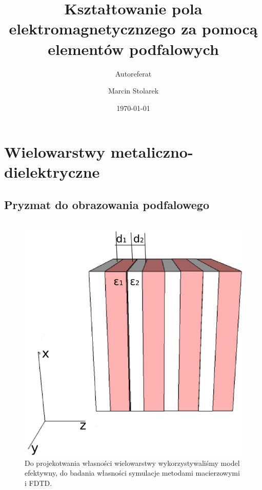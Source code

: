 \documentclass{beamer}
\title{Kształtowanie pola elektromagnetycznzego za pomocą elementów podfalowych}
\subtitle{Autoreferat}
\author{Marcin Stolarek}
\institute{Zakład Optyki Informacyjnej, Wydział Fizyki UW}
\date{\today}
\begin{document}
\frame{\titlepage}

\frame{\tableofcontents}

\section{Wielowarstwy metaliczno-dielektryczne}
\subsection{Pryzmat do obrazowania podfalowego}
\begin{frame}
	\begin{columns}
		\begin{column}{0.5\textwidth}
			\begin{figure}
				\includegraphics[width=\textwidth]{../images/multilayer/multilayer-3d.png}\\
		 	{\tiny Do projekotwania własności wielowarstwy wykorzystywaliśmy model efektywny, do badania własności symulacje metodami macierzowymi i FDTD.}


\end{figure}
\end{column}
\end{columns}
\end{frame}
\end{document}

